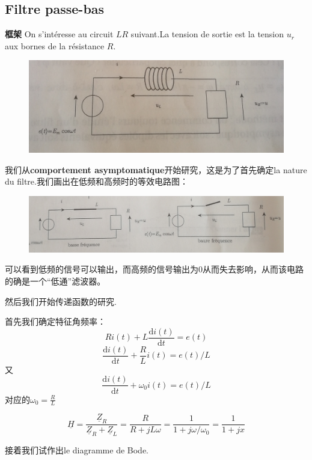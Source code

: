 \documentclass[12pt]{book}
\theoremstyle{definition}\newtheorem{dfn}{Définition}[chapter]
\theoremstyle{plain}\newtheorem{thm}{Théorème}[chapter]
\theoremstyle{plain}\newtheorem{prp}{Proposition}[chapter]
\theoremstyle{plain}\newtheorem{lem}{\bf Lemme}[chapter]
\theoremstyle{plain}\newtheorem{axm}{\bf Axiome}[chapter]
\theoremstyle{plain}\newtheorem{lmm}{\bf Lemme}[chapter]
\theoremstyle{plain}\newtheorem{cor}{\bf Corollaire}[chapter]
\theoremstyle{remark}\newtheorem{rem}{Remarque}[chapter]
\begin{document}
\subsection{Filtre passe-bas}
\begin{framed}{\textbf{框架}}
On s'intéresse au circuit $LR$ suivant.La tension de sortie est la tension $u_r$ aux bornes de la résistance $R$.
\end{framed}
\begin{figure}[H]
	\centering
	\includegraphics[scale=0.13]{Filtrage//2}
\end{figure}
我们从\textbf{comportement asymptomatique}开始研究，这是为了首先确定la nature du filtre.我们画出在低频和高频时的等效电路图：
\begin{figure}[H]
	\centering
	\includegraphics[scale=0.15]{Filtrage//3}
\end{figure}
可以看到低频的信号可以输出，而高频的信号输出为0从而失去影响，从而该电路的确是一个“低通”滤波器。

然后我们开始传递函数的研究.

首先我们确定特征角频率：
$$
Ri(t)+L\frac{\mathrm{d}i(t)}{\mathrm{d}t}=e(t)
$$
$$
\frac{\mathrm{d}i(t)}{\mathrm{d}t}+\frac{R}{L}i(t)=e(t)/L
$$
又
$$
\frac{\mathrm{d}i(t)}{\mathrm{d}t}+\omega_0i(t)=e(t)/L
$$
对应的$\omega_0=\frac{R}{L}$
\begin{framed}
	$$
	\underline{H}=\frac{\underline{Z}_R}{\underline{Z}_R+\underline{Z}_L}=\frac{R}{R+jL\omega}=\frac{1}{1+j\omega/\omega_0}=\frac{1}{1+jx}
	$$
\end{framed}

接着我们试作出le diagramme de Bode.
\end{document}
